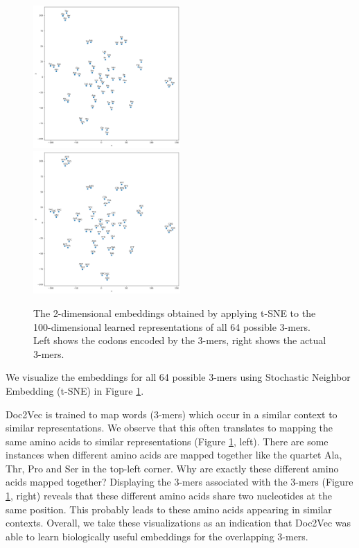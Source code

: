 \begin{figure}
	\includegraphics[width=0.5\textwidth]{../visualizations/ch4-methods/tSNE-d2v.png} 	\includegraphics[width=0.5\textwidth]{../visualizations/ch4-methods/tSNE-d2v_bases.png} 
	\caption{
		The 2-dimensional embeddings obtained by applying t-SNE to the 100-dimensional learned representations of all 64 possible 3-mers. Left shows the codons encoded by the 3-mers, right shows the actual 3-mers.
		 }
	\label{fig:tsne}
\end{figure}

We visualize the embeddings for all 64 possible 3-mers using Stochastic Neighbor Embedding (t-SNE) \cite{tsne} in Figure \ref{fig:tsne}.

Doc2Vec is trained to map words (3-mers) which occur in a similar context to similar representations. We observe that this often translates to mapping the same amino acids to similar representations (Figure \ref{fig:tsne}, left). There are some instances when different amino acids are mapped together like the quartet Ala, Thr, Pro and Ser in the top-left corner. Why are exactly these different amino acids mapped together? Displaying the 3-mers associated with the 3-mers (Figure \ref{fig:tsne}, right) reveals that these different amino acids share two nucleotides at the same position. This probably leads to these amino acids appearing in similar contexts.
Overall, we take these visualizations as an indication that Doc2Vec was able to learn biologically useful embeddings for the overlapping 3-mers.
